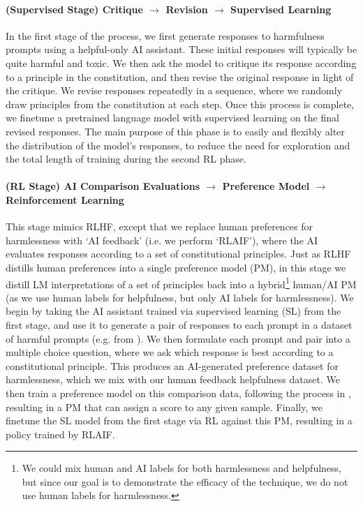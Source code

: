 \paragraph{(Supervised Stage) Critique $\to$ Revision $\to$ Supervised Learning} In the first stage of the process, we first generate responses to harmfulness prompts using a helpful-only AI assistant.  These initial responses will typically be quite harmful and toxic.  We then ask the model to critique its response according to a principle in the constitution, and then revise the original response in light of the critique.  We revise responses repeatedly in a sequence, where we randomly draw principles from the constitution at each step.  Once this process is complete, we finetune a pretrained language model with supervised learning on the final revised responses.  The main purpose of this phase is to easily and flexibly alter the distribution of the model's responses, to reduce the need for exploration and the total length of training  during the second RL phase.

\paragraph{(RL Stage) AI Comparison Evaluations $\to$ Preference Model $\to$ Reinforcement Learning} This stage mimics RLHF, except that we replace human preferences for harmlessness with `AI feedback' (i.e. we perform `RLAIF'), where the AI evaluates responses according to a set of constitutional principles.  Just as RLHF distills human preferences into a single preference model (PM), in this stage we distill LM interpretations of a set of principles back into a hybrid\footnote{We could mix human and AI labels for both harmlessness and helpfulness, but since our goal is to demonstrate the efficacy of the technique, we do not use human labels for harmlessness. } human/AI PM (as we use human labels for helpfulness, but only AI labels for harmlessness). We begin by taking the AI assistant trained via supervised learning (SL) from the first stage, and use it to generate a pair of responses to each prompt in a dataset of harmful prompts (e.g. from \cite{DeepRedTeaming}).  We then formulate each prompt and pair into a multiple choice question, where we ask which response is best  according to a constitutional principle.    This produces an AI-generated preference dataset for harmlessness, which we mix with our human feedback helpfulness dataset.  We then train a preference model on this comparison data, following  the process in \cite{bai2022training}, resulting in a PM that can assign a score to any given sample.  Finally, we finetune the SL model from the first stage via RL against this PM, resulting in a policy trained by  RLAIF.  

